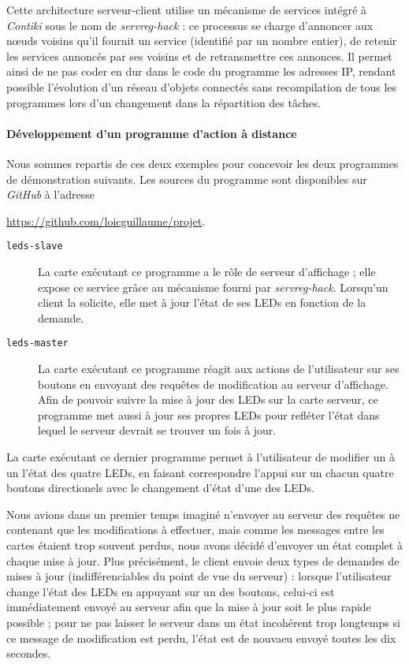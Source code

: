 Cette architecture serveur-client utilise un mécanisme de services intégré à \emph{Contiki} sous le nom de \emph{servreg-hack}  : ce processus se charge d’annoncer aux nœuds voisins qu’il fournit un service (identifié par un nombre entier), de retenir les services annoncés par ses voisins et de retransmettre ces annonces.
Il permet ainsi de ne pas coder en dur dans le code du programme les adresses IP, rendant possible l’évolution d’un réseau d’objets connectés sans recompilation de tous les programmes lors d’un changement dans la répartition des tâches.

\paragraph{Développement d’un programme d’action à distance}

Nous sommes repartis de ces deux exemples pour concevoir les deux programmes de démonstration suivants. Les sources du programme sont disponibles sur \emph{GitHub} à l’adresse
\begin{center}
\url{https://github.com/loicguillaume/projet}.
\end{center}

\begin{description}
	\item[\texttt{leds-slave}]
		La carte exécutant ce programme a le rôle de serveur d’affichage ; elle expose ce service grâce au mécanisme fourni par \emph{servreg-hack}.
		Lorsqu’un client la solicite, elle met à jour l’état de ses LEDs en fonction de la demande.
	\item[\texttt{leds-master}]
		La carte exécutant ce programme réagit aux actions de l’utilisateur sur ses boutons en envoyant des requêtes de modification au serveur d’affichage.
		Afin de pouvoir suivre la mise à jour des LEDs sur la carte serveur, ce programme met aussi à jour ses propres LEDs pour refléter l’état dans lequel le serveur devrait se trouver un fois à jour.
\end{description}

La carte exécutant ce dernier programme permet à l’utilisateur de modifier un à un l’état des quatre LEDs, en faisant correspondre l’appui sur un chacun quatre boutons directionels avec le changement d’état d’une des LEDs.

Nous avions dans un premier temps imaginé n’envoyer au serveur des requêtes ne contenant que les modifications à effectuer, mais comme les messages entre les cartes étaient trop souvent perdus, nous avons décidé d’envoyer un état complet à chaque mise à jour.
Plus précisément, le client envoie deux types de demandes de mises à jour (indifférenciables du point de vue du serveur) : lorsque l’utilisateur change l’état des LEDs en appuyant sur un des boutons, celui-ci est immédiatement envoyé au serveur afin que la mise à jour soit le plus rapide possible ; pour ne pas laisser le serveur dans un état incohérent trop longtemps si ce message de modification est perdu, l’état est de nouvaeu envoyé toutes les dix secondes.

